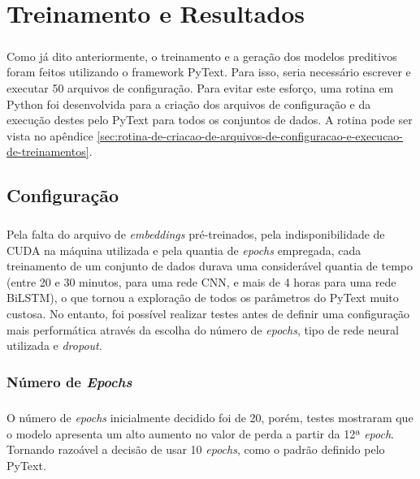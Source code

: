 \documentclass[grad,numbers]{coppe}
\begin{document}
  \chapter{Treinamento e Resultados}
	  \paragraph{}Como já dito anteriormente, o treinamento e a geração dos modelos preditivos foram feitos utilizando o framework PyText. Para isso, seria necessário escrever e executar 50 arquivos de configuração. Para evitar este esforço, uma rotina em Python foi desenvolvida para a criação dos arquivos de configuração e da execução destes pelo PyText para todos os conjuntos de dados. A rotina pode ser vista no apêndice \ref{sec:rotina-de-criacao-de-arquivos-de-configuracao-e-execucao-de-treinamentos}.
	  \section{Configuração}
		  \paragraph{}Pela falta do arquivo de \textit{embeddings} pré-treinados, pela indisponibilidade de CUDA na máquina utilizada e pela quantia de \textit{epochs} empregada, cada treinamento de um conjunto de dados durava uma considerável quantia de tempo (entre 20 e 30 minutos, para uma rede CNN, e mais de 4 horas para uma rede BiLSTM), o que tornou a exploração de todos os parâmetros do PyText muito custosa. No entanto, foi possível realizar testes antes de definir uma configuração mais performática através da escolha do número de \textit{epochs}, tipo de rede neural utilizada e \textit{dropout}.
		  \subsection{Número de \textit{Epochs}}
		  	\paragraph{}O número de \textit{epochs} inicialmente decidido foi de 20, porém, testes mostraram que o modelo apresenta um alto aumento no valor de perda a partir da 12ª \textit{epoch}. Tornando razoável a decisão de usar 10 \textit{epochs}, como o padrão definido pelo PyText.
\end{document}
